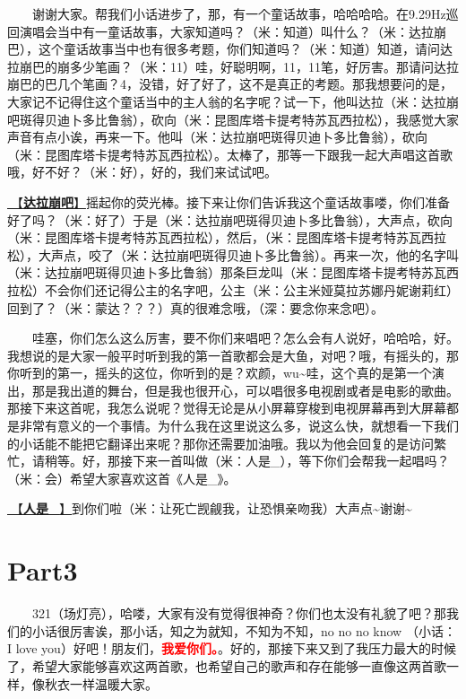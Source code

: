 \documentclass[]{ctexbook}
\begin{document}
  谢谢大家。帮我们小话进步了，那，有一个童话故事，哈哈哈哈。在9.29Hz巡回演唱会当中有一童话故事，大家知道吗？（米：知道）叫什么？（米：达拉崩巴），这个童话故事当中也有很多考题，你们知道吗？（米：知道）知道，请问达拉崩巴的崩多少笔画？（米：11）哇，好聪明啊，11，11笔，好厉害。那请问达拉崩巴的巴几个笔画？4，没错，好了好了，这不是真正的考题。那我想要问的是，大家记不记得住这个童话当中的主人翁的名字呢？试一下，他叫达拉（米：达拉崩吧斑得贝迪卜多比鲁翁），砍向（米：昆图库塔卡提考特苏瓦西拉松），我感觉大家声音有点小诶，再来一下。他叫（米：达拉崩吧斑得贝迪卜多比鲁翁），砍向（米：昆图库塔卡提考特苏瓦西拉松）。太棒了，那等一下跟我一起大声唱这首歌哦，好不好？（米：好），好的，我们来试试吧。

\hyperref[dalabengba]{🎵【\textbf{达拉崩吧}】}摇起你的荧光棒。接下来让你们告诉我这个童话故事喽，你们准备好了吗？（米：好了）于是（米：达拉崩吧斑得贝迪卜多比鲁翁），大声点，砍向（米：昆图库塔卡提考特苏瓦西拉松），然后，（米：昆图库塔卡提考特苏瓦西拉松），大声点，咬了（米：达拉崩吧斑得贝迪卜多比鲁翁）。再来一次，他的名字叫（米：达拉崩吧斑得贝迪卜多比鲁翁）那条巨龙叫（米：昆图库塔卡提考特苏瓦西拉松）不会你们还记得公主的名字吧，公主（米：公主米娅莫拉苏娜丹妮谢莉红）回到了？（米：蒙达？？？）真的很难念哦，（深：要念你来念吧）。

  哇塞，你们怎么这么厉害，要不你们来唱吧？怎么会有人说好，哈哈哈，好。我想说的是大家一般平时听到我的第一首歌都会是大鱼，对吧？哦，有摇头的，那你听到的第一，摇头的这位，你听到的是？欢颜，wu\textasciitilde 哇，这个真的是第一个演出，那是我出道的舞台，但是我也很开心，可以唱很多电视剧或者是电影的歌曲。那接下来这首呢，我怎么说呢？觉得无论是从小屏幕穿梭到电视屏幕再到大屏幕都是非常有意义的一个事情。为什么我在这里说这么多，说这么快，就想看一下我们的小话能不能把它翻译出来呢？那你还需要加油哦。我以为他会回复的是访问繁忙，请稍等。好，那接下来一首叫做（米：人是\_），等下你们会帮我一起唱吗？（米：会）希望大家喜欢这首《人是\_》。

\hyperref[renshi]{🎵【\textbf{人是\_}】}到你们啦（米：让死亡觊觎我，让恐惧亲吻我）大声点\textasciitilde 谢谢\textasciitilde{}

\section{Part3}\label{LasVegas-20250301-part3}

  321（场灯亮），哈喽，大家有没有觉得很神奇？你们也太没有礼貌了吧？那我们的小话很厉害诶，那小话，知之为就知，不知为不知，no no no know （小话：I love you）好吧！朋友们，\textbf{\textcolor{red}{我爱你们。}}。好的，那接下来又到了我压力最大的时候了，希望大家能够喜欢这两首歌，也希望自己的歌声和存在能够一直像这两首歌一样，像秋衣一样温暖大家。
\end{document}
